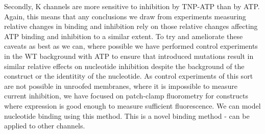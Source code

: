 Secondly, K\ATP{} channels are more sensitive to inhibition by TNP-ATP than by ATP.
Again, this means that any conclusions we draw from experiments measuring relative changes in binding and inhibition rely on those relative changes affecting ATP binding and inhibition to a similar extent.
To try and ameliorate these caveats as best as we can, where possible we have performed control experiments in the WT background with ATP to ensure that introduced mutations result in similar relative effects on nucleotide inhibition despite the background of the construct or the identitity of the nucleotide.
As control experiments of this sort are not possible in unroofed membranes, where it is impossible to measure current inhibition, we have focused on patch-clamp fluorometry for constructs where expression is good enough to measure sufficient fluorescence.
We can model nucleotide binding using this method.
This is a novel binding method - can be applied to other channels.